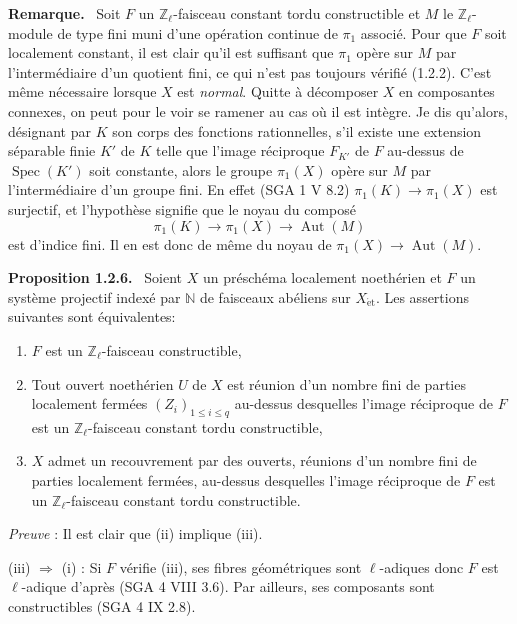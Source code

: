 \documentclass[11pt]{article}
\newenvironment{statement}[1]{\par\medskip\noindent\textbf{#1.}\ }{\par\medskip}
\DeclareMathOperator{\Spec}{Spec}
\providecommand{\Aut}{\operatorname{Aut}}
\providecommand{\Spec}{\operatorname{Spec}}
\providecommand{\Spec}{\operatorname{Spec}}
\providecommand{\Aut}{\operatorname{Aut}}
\providecommand{\Spec}{\operatorname{Spec}}
\providecommand{\Spec}{\operatorname{Spec}}
\begin{document}
\begin{statement}{Remarque}
Soit \(F\) un \(\mathbb Z_\ell\)-faisceau constant tordu constructible et \(M\) le \(\mathbb Z_\ell\)-module de type fini muni d'une opération continue de \(\pi_1\) associé. Pour que \(F\) soit localement constant, il est clair qu'il est suffisant que \(\pi_1\) opère sur \(M\) par l'intermédiaire d'un quotient fini, ce qui n'est pas toujours vérifié (1.2.2). C'est même nécessaire lorsque \(X\) est \emph{normal}. Quitte à décomposer \(X\) en composantes connexes, on peut pour le voir se ramener au cas où il est intègre. Je dis qu'alors, désignant par \(K\) son corps des fonctions rationnelles, s'il existe une extension séparable finie \(K'\) de \(K\) telle que l'image réciproque \(F_{K'}\) de \(F\) au-dessus de \(\Spec(K')\) soit constante, alors le groupe \(\pi_1(X)\) opère sur \(M\) par l'intermédiaire d'un groupe fini. En effet (SGA 1 V 8.2) \(\pi_1(K)\to \pi_1(X)\) est surjectif, et l'hypothèse signifie que le noyau du composé
\[
\pi_1(K)\longrightarrow \pi_1(X)\longrightarrow \Aut(M)
\]
est d'indice fini. Il en est donc de même du noyau de \(\pi_1(X)\to\Aut(M)\).
\end{statement}

\begin{statement}{Proposition 1.2.6}
Soient \(X\) un préschéma localement noethérien et \(F\) un système projectif indexé par \(\mathbb N\) de faisceaux abéliens sur \(X_{\mathrm{\acute et}}\). Les assertions suivantes sont équivalentes:
\begin{enumerate}[label=(\roman*)]
\item \(F\) est un \(\mathbb Z_\ell\)-faisceau constructible,
\item Tout ouvert noethérien \(U\) de \(X\) est réunion d'un nombre fini de parties localement fermées \((Z_i)_{1\le i\le q}\) au-dessus desquelles l'image réciproque de \(F\) est un \(\mathbb Z_\ell\)-faisceau constant tordu constructible,
\item \(X\) admet un recouvrement par des ouverts, réunions d'un nombre fini de parties localement fermées, au-dessus desquelles l'image réciproque de \(F\) est un \(\mathbb Z_\ell\)-faisceau constant tordu constructible.
\end{enumerate}
\end{statement}


\emph{Preuve} : Il est clair que (ii) implique (iii).

(iii) \(\Longrightarrow\) (i) : Si \(F\) vérifie (iii), ses fibres géométriques sont \(\ell\)-adiques donc \(F\) est \(\ell\)-adique d'après (SGA 4 VIII 3.6). Par ailleurs, ses composants sont constructibles (SGA 4 IX 2.8).
\end{document}

